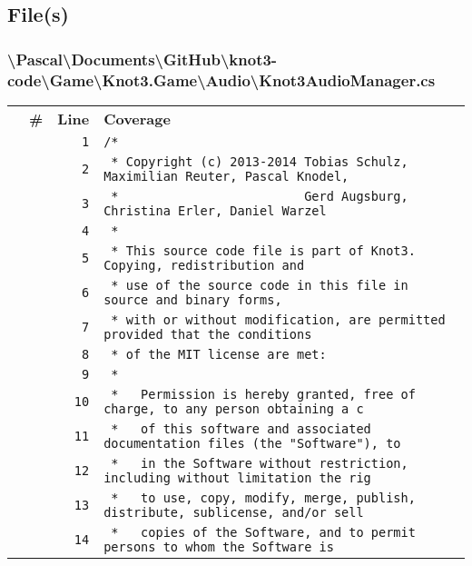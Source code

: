 \documentclass[a4paper,10pt]{article}
\begin{document}
\subsection{File(s)}
\subsubsection{\textbackslash Pascal\textbackslash Documents\textbackslash GitHub\textbackslash knot3-code\textbackslash Game\textbackslash Knot3.Game\textbackslash Audio\textbackslash Knot3AudioManager.cs}
\begin{longtable}[l]{lrrl}
\textbf{} & \textbf{\#} & \textbf{Line} & \textbf{Coverage}\\
\cellcolor{gray} &  & \verb~1~ & \verb~/*~\\
\cellcolor{gray} &  & \verb~2~ & \verb~ * Copyright (c) 2013-2014 Tobias Schulz, Maximilian Reuter, Pascal Knodel,~\\
\cellcolor{gray} &  & \verb~3~ & \verb~ *                         Gerd Augsburg, Christina Erler, Daniel Warzel~\\
\cellcolor{gray} &  & \verb~4~ & \verb~ *~\\
\cellcolor{gray} &  & \verb~5~ & \verb~ * This source code file is part of Knot3. Copying, redistribution and~\\
\cellcolor{gray} &  & \verb~6~ & \verb~ * use of the source code in this file in source and binary forms,~\\
\cellcolor{gray} &  & \verb~7~ & \verb~ * with or without modification, are permitted provided that the conditions~\\
\cellcolor{gray} &  & \verb~8~ & \verb~ * of the MIT license are met:~\\
\cellcolor{gray} &  & \verb~9~ & \verb~ *~\\
\cellcolor{gray} &  & \verb~10~ & \verb~ *   Permission is hereby granted, free of charge, to any person obtaining a c~\\
\cellcolor{gray} &  & \verb~11~ & \verb~ *   of this software and associated documentation files (the "Software"), to ~\\
\cellcolor{gray} &  & \verb~12~ & \verb~ *   in the Software without restriction, including without limitation the rig~\\
\cellcolor{gray} &  & \verb~13~ & \verb~ *   to use, copy, modify, merge, publish, distribute, sublicense, and/or sell~\\
\cellcolor{gray} &  & \verb~14~ & \verb~ *   copies of the Software, and to permit persons to whom the Software is~\\

\end{longtable}
\end{document}
